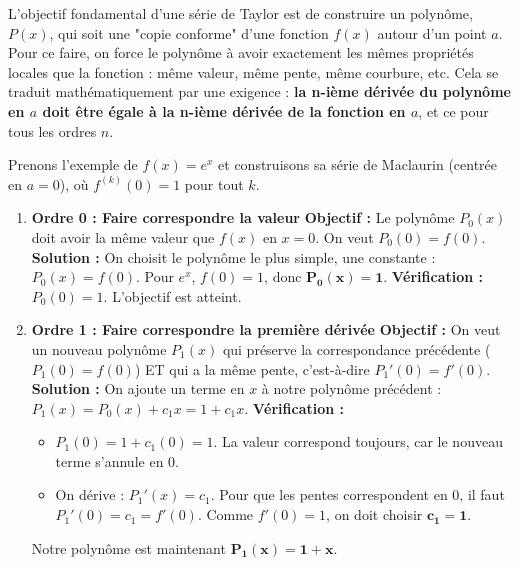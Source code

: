 \begin{intuitionbox}
L'objectif fondamental d'une série de Taylor est de construire un polynôme, $P(x)$, qui soit une "copie conforme" d'une fonction $f(x)$ autour d'un point $a$. Pour ce faire, on force le polynôme à avoir exactement les mêmes propriétés locales que la fonction : même valeur, même pente, même courbure, etc. Cela se traduit mathématiquement par une exigence : \textbf{la n-ième dérivée du polynôme en $a$ doit être égale à la n-ième dérivée de la fonction en $a$}, et ce pour tous les ordres $n$.

Prenons l'exemple de $f(x) = e^x$ et construisons sa série de Maclaurin (centrée en $a=0$), où $f^{(k)}(0)=1$ pour tout $k$.

\begin{enumerate}
    \item \textbf{Ordre 0 : Faire correspondre la valeur}
    \newline
    \textbf{Objectif :} Le polynôme $P_0(x)$ doit avoir la même valeur que $f(x)$ en $x=0$. On veut $P_0(0) = f(0)$.
    \newline
    \textbf{Solution :} On choisit le polynôme le plus simple, une constante : $P_0(x) = f(0)$. Pour $e^x$, $f(0)=1$, donc $\mathbf{P_0(x) = 1}$.
    \newline
    \textbf{Vérification :} $P_0(0) = 1$. L'objectif est atteint.

    \item \textbf{Ordre 1 : Faire correspondre la première dérivée}
    \newline
    \textbf{Objectif :} On veut un nouveau polynôme $P_1(x)$ qui préserve la correspondance précédente ($P_1(0) = f(0)$) ET qui a la même pente, c'est-à-dire $P_1'(0) = f'(0)$.
    \newline
    \textbf{Solution :} On ajoute un terme en $x$ à notre polynôme précédent : $P_1(x) = P_0(x) + c_1 x = 1 + c_1 x$.
    \newline
    \textbf{Vérification :}
    \begin{itemize}
        \item $P_1(0) = 1 + c_1(0) = 1$. La valeur correspond toujours, car le nouveau terme s'annule en 0.
        \item On dérive : $P_1'(x) = c_1$. Pour que les pentes correspondent en 0, il faut $P_1'(0) = c_1 = f'(0)$. Comme $f'(0)=1$, on doit choisir $\mathbf{c_1=1}$.
    \end{itemize}
    Notre polynôme est maintenant $\mathbf{P_1(x) = 1+x}$.


\end{enumerate}
\end{intuitionbox}
